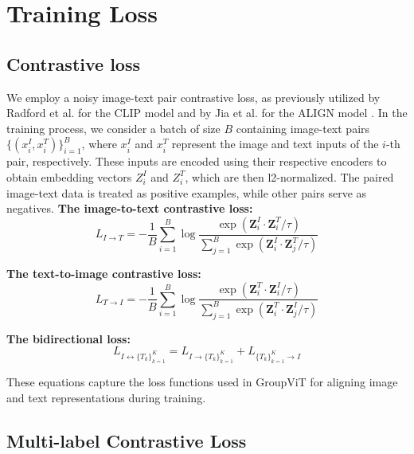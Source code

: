 



\section{Training Loss}

\subsection{Contrastive loss}
\label{sec:loss}
 We employ a noisy image-text pair contrastive loss, as previously utilized by Radford et al. for the CLIP model \cite{radford2021learning} and by Jia et al. for the ALIGN model \cite{jia2021scaling}. In the training process, we consider a batch of size $B$ containing image-text pairs $\{(x^{I}_i, x^T_i)\}_{i=1}^B$, where $x^I_i$ and $x^T_i$ represent the image and text inputs of the $i$-th pair, respectively. These inputs are encoded using their respective encoders to obtain embedding vectors $Z^I_i$ and $Z^T_i$, which are then l2-normalized. The paired image-text data is treated as positive examples, while other pairs serve as negatives. 
\textbf{The image-to-text contrastive loss:}
\begin{equation}
L_{I\rightarrow T} = -\frac{1}{B} \sum_{i=1}^{B} \log \frac{\exp(\textbf{Z}^I_i \cdot \textbf{Z}^T_i / \tau)}{\sum_{j=1}^{B} \exp(\textbf{Z}^I_i \cdot \textbf{Z}^T_j / \tau)}
\end{equation}

\textbf{The text-to-image contrastive loss:}
\begin{equation}
L_{T\rightarrow I} = -\frac{1}{B} \sum_{i=1}^{B} \log \frac{\exp(\textbf{Z}^T_i \cdot \textbf{Z}^I_i / \tau)}{\sum_{j=1}^{B} \exp(\textbf{Z}^T_i \cdot \textbf{Z}^I_j / \tau)}
\end{equation}

\textbf{The bidirectional loss:}
\begin{equation}
\label{eq:cl}
L_{I \leftrightarrow \{T_k\}_{k=1}^K} = L_{I\rightarrow \{T_k\}_{k=1}^K} + L_{\{T_k\}_{k=1}^K \rightarrow I}
\end{equation}

These equations capture the loss functions used in GroupViT for aligning image and text representations during training.


\subsection{Multi-label Contrastive Loss}
\label{sec:mll}

